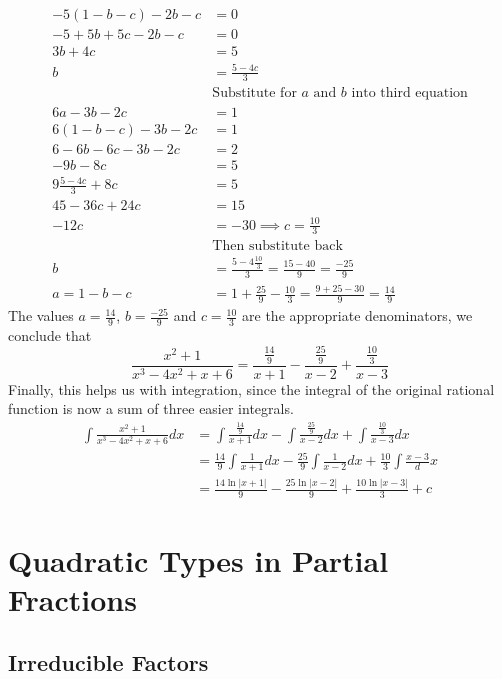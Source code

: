\documentclass[fleqn]{report}
\begin{document}
\begin{example}
\begin{align*}
-5(1-b-c) - 2b - c & = 0 \\
-5+5b+5c - 2b -c & = 0 \\
3b + 4c & = 5 \\
b & = \frac{5-4c}{3} \\
& \text{Substitute for $a$ and $b$ into third
equation} \\
6a - 3b -2c & = 1 \\
6(1-b-c) - 3b - 2c & = 1 \\
6-6b-6c-3b-2c & = 2 \\
-9b - 8c & = 5 \\
9 \frac{5-4c}{3} + 8 c & = 5 \\
45 - 36c + 24 c & = 15 \\
-12 c & = -30 \implies c = \frac{10}{3}\\
& \text{Then substitute back} \\
b & = \frac{5 - 4 \frac{10}{3}}{3} = \frac{15-40}{9} =
\frac{-25}{9} \\
a = 1 - b - c & = 1 + \frac{25}{9} - \frac{10}{3} =
\frac{9+25-30}{9} = \frac{14}{9} 
\end{align*}
The values $a = \frac{14}{9}$, $b = \frac{-25}{9}$ and
$c = \frac{10}{3}$ are the appropriate denominators, we
conclude that 
\begin{equation*}
\frac{x^2+1}{x^3-4x^2+x+6} = \frac{\frac{14}{9}}{x+1} -
\frac{\frac{25}{9}}{x-2} + \frac{\frac{10}{3}}{x-3} 
\end{equation*}
Finally, this helps us with integration, since the integral of
the original rational function is now a sum of three easier
integrals.
\begin{align*}
\int \frac{x^2+1}{x^3-4x^2+x+6} dx & = \int
\frac{\frac{14}{9}}{x+1} dx - \int \frac{\frac{25}{9}}{x-2} dx
+ \int \frac{\frac{10}{3}}{x-3} dx \\
& = \frac{14}{9} \int 
\frac{1}{x+1} dx - \frac{25}{9} \int \frac{1}{x-2} dx +
\frac{10}{3} \int \frac{x-3} dx \\
& = \frac{14 \ln |x+1|}{9} - \frac{25\ln |x-2|}{9} +
\frac{10 \ln |x-3|}{3} + c
\end{align*}
\end{example}

\section{Quadratic Types in Partial Fractions}
\label{quadratic-types}

\subsection{Irreducible Factors}
\label{irreducible-factors}
\end{document}
